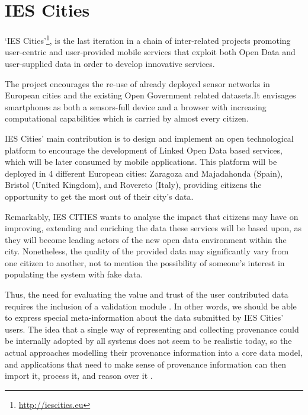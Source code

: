 \section{IES Cities}
\label{sec:ies_cities}

`IES Cities'\footnote{\url{http://iescities.eu}}, is the last iteration in a chain of inter-related projects promoting user-centric and user-provided mobile services that exploit both Open Data and user-supplied data in order to develop innovative services.

The project encourages the re-use of already deployed sensor networks in European cities and the existing Open Government related datasets.It envisages smartphones as both a sensors-full device and a browser with increasing computational capabilities which is carried by almost every citizen.

IES Cities' main contribution is to design and implement an open technological platform to encourage the development of Linked Open Data based services, which will be later consumed by mobile applications. This platform will be deployed in 4 different European cities: Zaragoza and Majadahonda (Spain), Bristol (United Kingdom), and Rovereto (Italy), providing citizens the opportunity to get the most out of their city's data.

Remarkably, IES CITIES wants to analyse the impact that citizens may have on improving, extending and enriching the data these services will be based upon, as they will become leading actors of the new open data environment within the city. Nonetheless, the quality of the provided data may significantly vary from one citizen to another, not to mention the possibility of someone's interest in populating the system with fake data.

Thus, the need for evaluating the value and trust of the user contributed data requires the inclusion of a validation module \cite{hartig_publishing_2010}. In other words, we should be able to express special meta-information about the data submitted by IES Cities' users. The idea that a single way of representing and collecting provenance could be internally adopted by all systems does not seem to be realistic today, so the actual approaches modelling their provenance information into a core data model, and applications that need to make sense of provenance information can then import it, process it, and reason over it \cite{ceolin_trust_2012}.

